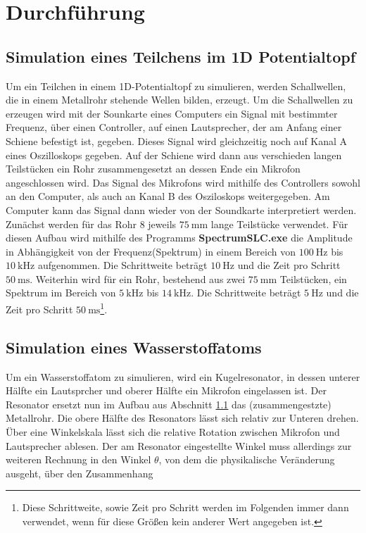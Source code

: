 \section{Durchführung}
\label{sec:Durchführung}

\subsection{Simulation eines Teilchens im 1D Potentialtopf}
\label{subsec:ch1}
Um ein Teilchen in einem 1D-Potentialtopf zu simulieren,
werden Schallwellen, die in einem Metallrohr stehende Wellen
bilden, erzeugt. Um die Schallwellen zu erzeugen wird
mit der Sounkarte eines Computers ein Signal mit bestimmter
Frequenz, über einen Controller, auf einen Lautsprecher, der am Anfang einer Schiene
befestigt ist, gegeben. Dieses Signal wird gleichzeitig noch auf Kanal A eines Oszilloskops gegeben.
Auf der Schiene wird dann aus verschieden langen Teilstücken
ein Rohr zusammengesetzt an dessen Ende ein Mikrofon
angeschlossen wird. Das Signal des Mikrofons wird mithilfe des Controllers
sowohl an den Computer, als auch an Kanal B des Osziloskops weitergegeben.
Am Computer kann das Signal dann wieder von der Soundkarte interpretiert werden.\\
Zunächst werden für das Rohr $8$ jeweils $\SI{75}{\milli\meter}$
lange Teilstücke verwendet. Für diesen Aufbau wird mithilfe des
Programms \textbf{SpectrumSLC.exe} die Amplitude in Abhängigkeit
von der Frequenz(Spektrum) in einem Bereich von $\SI{100}{\hertz}$ bis
$\SI{10}{\kilo\hertz}$ aufgenommen. Die Schrittweite beträgt
$\SI{10}{\hertz}$ und die Zeit pro Schritt
$\SI{50}{\milli\second}$.
Weiterhin wird für ein Rohr, bestehend aus zwei
$\SI{75}{\milli\meter}$ Teilstücken, ein Spektrum im Bereich
von $\SI{5}{\kilo\hertz}$ bis $\SI{14}{\kilo\hertz}$.
Die Schrittweite beträgt $\SI{5}{\hertz}$ und die Zeit pro Schritt
$\SI{50}{\milli\second}$\footnote{Diese Schrittweite, sowie Zeit pro Schritt werden im
Folgenden immer dann verwendet, wenn für diese Größen
kein anderer Wert angegeben ist.}.



\subsection{Simulation eines Wasserstoffatoms}
\label{subsec:ch2}
Um ein Wasserstoffatom zu simulieren, wird ein
Kugelresonator, in dessen unterer Hälfte ein Lautsprcher
und oberer Hälfte ein Mikrofon eingelassen ist.
Der Resonator ersetzt nun im Aufbau aus Abschnitt
\ref{subsec:ch1} das (zusammengestzte) Metallrohr.
Die obere Hälfte des Resonators lässt sich relativ
zur Unteren drehen. Über eine Winkelskala lässt sich
die relative Rotation zwischen Mikrofon und
Lautsprecher ablesen. Der am Resonator eingestellte Winkel
muss allerdings zur weiteren Rechnung in den Winkel $\theta$,
von dem die physikalische Veränderung ausgeht, über den Zusammenhang

